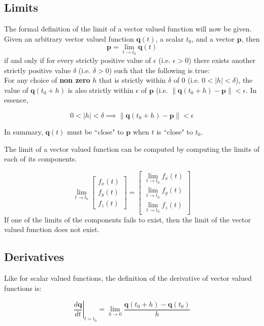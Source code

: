 \documentclass{article}
\begin{document}
\subsection*{Limits}

The formal definition of the limit of a vector valued function will now be given. Given an arbitrary vector valued function \(\mathbf{q}(t)\), a scalar \(t_0\), and a vector \(\mathbf{p}\), then 
\[\mathbf{p} = \lim_{t \rightarrow t_0} \mathbf{q}(t)\]
if and only if for every strictly positive value of \(\epsilon\) (i.e. \(\epsilon > 0\)) there exists another strictly positive value \(\delta\) (i.e. \(\delta > 0\)) such that the following is true: \\ 
For any choice of {\bf non zero} \(h\) that is strictly within \(\delta\) of \(0\) (i.e. \(0 < |h| < \delta\)), the value of \(\mathbf{q}(t_0 + h)\) is also strictly within \(\epsilon\) of \(\mathbf{p}\) (i.e. \(\|\mathbf{q}(t_0 + h) - \mathbf{p}\| < \epsilon\). In essence,

\[0 < |h| < \delta \implies \|\mathbf{q}(t_0 + h) - \mathbf{p}\| < \epsilon\]

In summary, \(\mathbf{q}(t)\) must be ``close" to \(\mathbf{p}\) when \(t\) is ``close" to \(t_0\).

The limit of a vector valued function can be computed by computing the limits of each of its components.

\[\lim_{t \rightarrow t_0} \begin{bmatrix} f_x(t) \\ f_y(t) \\ f_z(t) \end{bmatrix} = \begin{bmatrix} \lim_{t \rightarrow t_0} f_x(t) \\ \lim_{t \rightarrow t_0} f_y(t) \\ \lim_{t \rightarrow t_0} f_z(t) \end{bmatrix}\]
If one of the limits of the components fails to exist, then the limit of the vector valued function does not exist.



\subsection*{Derivatives}

Like for scalar valued functions, the definition of the derivative of vector valued functions is:

\[\left.\frac{d\mathbf{q}}{dt}\right|_{t = t_0} = \lim_{h \rightarrow 0} \frac{\mathbf{q}(t_0 + h) - \mathbf{q}(t_0)}{h}\]
\end{document}

